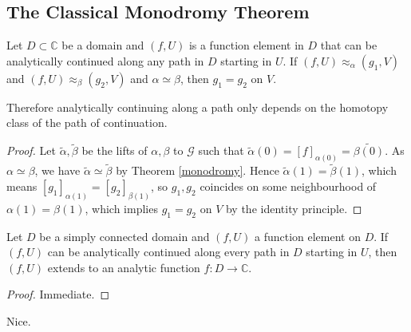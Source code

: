 \subsection{The Classical Monodromy Theorem}
\begin{theorem}
    Let $D\subset\mathbb C$ be a domain and $(f,U)$ is a function element in $D$ that can be analytically continued along any path in $D$ starting in $U$.
    If $(f,U)\approx_\alpha (g_1,V)$ and $(f,U)\approx_\beta(g_2,V)$ and $\alpha\simeq\beta$, then $g_1=g_2$ on $V$.
\end{theorem}
Therefore analytically continuing along a path only depends on the homotopy class of the path of continuation.
\begin{proof}
    Let $\tilde{\alpha},\tilde{\beta}$ be the lifts of $\alpha,\beta$ to $\mathcal G$ such that $\tilde{\alpha}(0)=[f]_{\alpha(0)}=\tilde{\beta(0)}$.
    As $\alpha\simeq\beta$, we have $\tilde{\alpha}\simeq\tilde{\beta}$ by Theorem \ref{monodromy}.
    Hence $\tilde{\alpha}(1)=\tilde{\beta}(1)$, which means $[g_1]_{\alpha(1)}=[g_2]_{\beta(1)}$, so $g_1,g_2$ coincides on some neighbourhood of $\alpha(1)=\beta(1)$, which implies $g_1=g_2$ on $V$ by the identity principle.
\end{proof}
\begin{corollary}
    Let $D$ be a simply connected domain and $(f,U)$ a function element on $D$.
    If $(f,U)$ can be analytically continued along every path in $D$ starting in $U$, then $(f,U)$ extends to an analytic function $f:D\to\mathbb C$.
\end{corollary}
\begin{proof}
    Immediate.
\end{proof}
Nice.